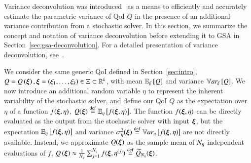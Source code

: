 Variance deconvolution was introduced~\cite{clements-etal-2024, olson-2019} as a means to efficiently and accurately estimate the parametric variance of QoI $Q$ in the presence of an additional variance contribution from a stochastic solver.  
In this section, we summarize the concept and notation of variance deconvolution before extending it to GSA in Section~\ref{sec:gsa-deconvolution}.
For a detailed presentation of variance deconvolution, see~\cite{clements-etal-2024}. 

We consider the same generic QoI defined in Section~\ref{sec:intro}, $Q = Q\left( \bm{\xi} \right), \bm{\xi} = \left( \xi_1,\ldots,\xi_k \right) \in \Xi \subset \mathbb{R}^k$, with mean $\mathbb{E}_\xi\left[Q\right]$ and variance $\mathbb{V}ar_{\xi}\left[Q\right]$.
We now introduce an additional random variable $\eta$ to represent the inherent variability of the stochastic solver, and define our QoI $Q$ as the expectation over $\eta$ of a function $f(\bm{\xi}, \eta)$, $Q(\bm{\xi}) \overset{\operatorname{def}}{=} \mathbb{E}_\eta\left[f(\bm{\xi},\eta)\right]$. 
The function $f(\bm{\xi}, \eta)$ can be directly evaluated as the output from the stochastic solver with input $\bm{\xi}$, but the expectation $\mathbb{E}_\eta\left[f(\bm{\xi},\eta)\right]$ and variance $\sigma^2_\eta (\bm{\xi}) \overset{\operatorname{def}}{=} \mathbb{V}ar_{\eta}\left[f(\bm{\xi},\eta)\right]$ are not directly available.
Instead, we approximate $Q(\bm{\xi})$ as the sample mean of ${N_\eta}$ independent evaluations of $f$, $Q\left(\bm{\xi}\right) \approx \frac{1}{{N_\eta}}\sum_{j=1}^{{N_\eta}} f (\bm{\xi}, \eta^{(j)}) \overset{\operatorname{def}}{=} \widetilde{Q}_{{N_\eta}} (\bm{\xi})$.

